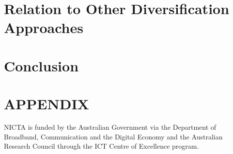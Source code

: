 \documentclass[prodmode,acmtecs]{acmsmall}
\begin{document}
\section{Relation to Other Diversification Approaches}
\label{sec:related_work}


\section{Conclusion}
\label{sec:conclusion}


\newpage


\appendix
\section*{APPENDIX}


\begin{acks}
NICTA is funded by the Australian Government via 
the Department of Broadband, Communication and the Digital
Economy and the Australian Research Council through the ICT
Centre of Excellence program.
\end{acks}





%
%
%
\end{document}
